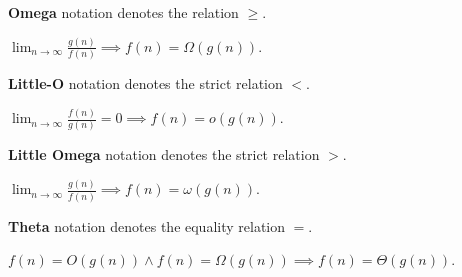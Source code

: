 \begin{definition}
	\textbf{Omega} notation denotes the relation \( \ge  \).
\end{definition}

\begin{lemma}
	\( \lim_{n \to \infty} \frac{g(n)}{f(n)} \implies f(n) = \Omega(g(n)) \).
\end{lemma}

\begin{definition}
	\textbf{Little-O} notation denotes the strict relation \( < \).
\end{definition}

\begin{lemma}
	\( \lim_{n \to \infty} \frac{f(n)}{g(n)}=0 \implies f(n) = o(g(n)) \).
\end{lemma}

\begin{definition}
	\textbf{Little Omega} notation denotes the strict relation \( > \).
\end{definition}

\begin{lemma}
	\( \lim_{n \to \infty} \frac{g(n)}{f(n)} \implies f(n) = \omega(g(n))\).
\end{lemma}

\begin{definition}
	\textbf{Theta} notation denotes the equality relation \( = \).
\end{definition}

\begin{lemma}
	\( f(n) = O(g(n)) \land f(n) = \Omega(g(n)) \implies f(n) = \Theta(g(n)) \).
\end{lemma}
